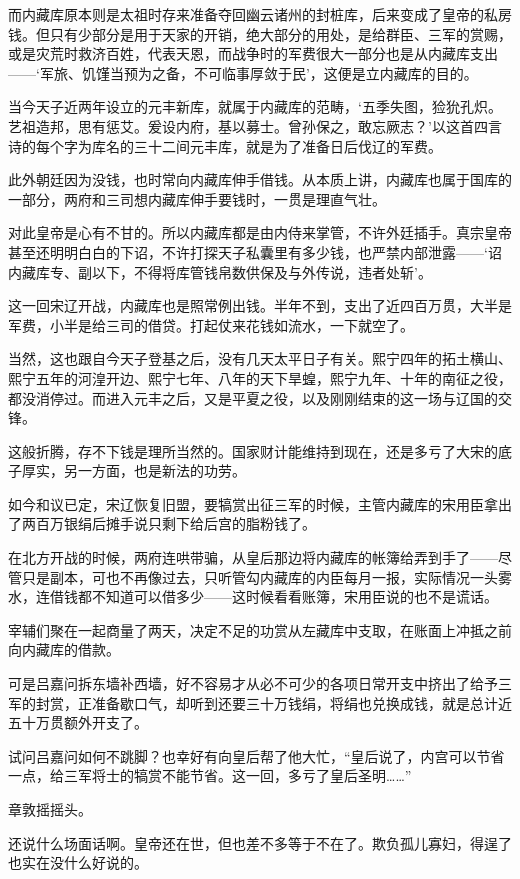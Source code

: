 而内藏库原本则是太祖时存来准备夺回幽云诸州的封桩库，后来变成了皇帝的私房钱。但只有少部分是用于天家的开销，绝大部分的用处，是给群臣、三军的赏赐，或是灾荒时救济百姓，代表天恩，而战争时的军费很大一部分也是从内藏库支出——‘军旅、饥馑当预为之备，不可临事厚敛于民’，这便是立内藏库的目的。

当今天子近两年设立的元丰新库，就属于内藏库的范畴，‘五季失图，猃狁孔炽。艺祖造邦，思有惩艾。爰设内府，基以募士。曾孙保之，敢忘厥志？’以这首四言诗的每个字为库名的三十二间元丰库，就是为了准备日后伐辽的军费。

此外朝廷因为没钱，也时常向内藏库伸手借钱。从本质上讲，内藏库也属于国库的一部分，两府和三司想内藏库伸手要钱时，一贯是理直气壮。

对此皇帝是心有不甘的。所以内藏库都是由内侍来掌管，不许外廷插手。真宗皇帝甚至还明明白白的下诏，不许打探天子私囊里有多少钱，也严禁内部泄露——‘诏内藏库专、副以下，不得将库管钱帛数供保及与外传说，违者处斩’。

这一回宋辽开战，内藏库也是照常例出钱。半年不到，支出了近四百万贯，大半是军费，小半是给三司的借贷。打起仗来花钱如流水，一下就空了。

当然，这也跟自今天子登基之后，没有几天太平日子有关。熙宁四年的拓土横山、熙宁五年的河湟开边、熙宁七年、八年的天下旱蝗，熙宁九年、十年的南征之役，都没消停过。而进入元丰之后，又是平夏之役，以及刚刚结束的这一场与辽国的交锋。

这般折腾，存不下钱是理所当然的。国家财计能维持到现在，还是多亏了大宋的底子厚实，另一方面，也是新法的功劳。

如今和议已定，宋辽恢复旧盟，要犒赏出征三军的时候，主管内藏库的宋用臣拿出了两百万银绢后摊手说只剩下给后宫的脂粉钱了。

在北方开战的时候，两府连哄带骗，从皇后那边将内藏库的帐簿给弄到手了——尽管只是副本，可也不再像过去，只听管勾内藏库的内臣每月一报，实际情况一头雾水，连借钱都不知道可以借多少——这时候看看账簿，宋用臣说的也不是谎话。

宰辅们聚在一起商量了两天，决定不足的功赏从左藏库中支取，在账面上冲抵之前向内藏库的借款。

可是吕嘉问拆东墙补西墙，好不容易才从必不可少的各项日常开支中挤出了给予三军的封赏，正准备歇口气，却听到还要三十万钱绢，将绢也兑换成钱，就是总计近五十万贯额外开支了。

试问吕嘉问如何不跳脚？也幸好有向皇后帮了他大忙，“皇后说了，内宫可以节省一点，给三军将士的犒赏不能节省。这一回，多亏了皇后圣明……”

章敦摇摇头。

还说什么场面话啊。皇帝还在世，但也差不多等于不在了。欺负孤儿寡妇，得逞了也实在没什么好说的。
